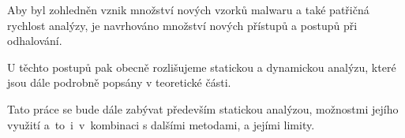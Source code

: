 Aby byl zohledněn vznik množství nových vzorků malwaru a také patřičná rychlost analýzy, je navrhováno množství nových přístupů a postupů při odhalování. 

U těchto postupů pak obecně rozlišujeme statickou a dynamickou analýzu, které jsou dále podrobně popsány v teoretické části.

Tato práce se bude dále zabývat především statickou analýzou, možnostmi jejího využití a~to~i~v~kombinaci s dalšími metodami, a jejími limity.


%